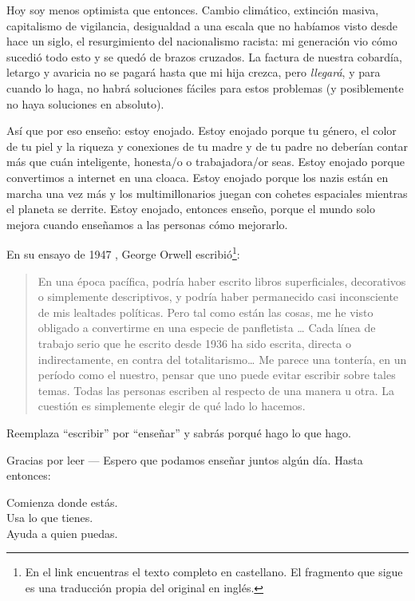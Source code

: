 Hoy soy menos optimista que entonces.
Cambio climático,
extinción masiva,
capitalismo de vigilancia,
desigualdad a una escala que no habíamos visto desde hace un siglo,
el resurgimiento del nacionalismo racista:
mi generación vio cómo sucedió todo esto y se quedó de brazos cruzados.
La factura de nuestra cobardía, letargo y avaricia no se pagará hasta que mi hija crezca,
pero \emph{llegará},
y para cuando lo haga, no habrá soluciones fáciles para estos problemas
(y posiblemente no haya soluciones en absoluto).

Así que por eso enseño:
estoy enojado.
Estoy enojado porque tu género, el color de tu piel y la riqueza y conexiones de tu madre y de tu padre
no deberían contar más que cuán inteligente, honesta/o o trabajadora/or seas.
Estoy enojado porque convertimos a internet en una cloaca.
Estoy enojado porque los nazis están en marcha una vez más
y los multimillonarios juegan con cohetes espaciales mientras el planeta se derrite.
Estoy enojado,
entonces enseño,
porque el mundo solo mejora cuando enseñamos a las personas cómo mejorarlo.

En su ensayo de 1947
, George Orwell escribió\footnote{En el link encuentras el texto completo en castellano. El fragmento que sigue es una traducción propia del original en inglés.}:

\begin{quote}

  En una época pacífica, podría haber escrito libros superficiales, decorativos o simplemente  descriptivos,
  y podría haber permanecido casi inconsciente de mis lealtades políticas.
  Pero tal como están las cosas, me he visto obligado a convertirme en una especie de panfletista {\ldots}
  Cada línea de trabajo serio que he escrito desde 1936 ha sido escrita,
  directa o indirectamente,
  en contra del totalitarismo{\ldots}
  Me parece una tontería,
  en un período como el nuestro,
  pensar que uno puede evitar escribir sobre tales temas.
  Todas las personas escriben al respecto de una manera u otra.
  La cuestión es simplemente elegir de qué lado lo hacemos.

\end{quote}

\noindent
Reemplaza ``escribir'' por ``enseñar'' y sabrás porqué hago lo que hago.

\vspace{\baselineskip}

\noindent
Gracias por leer --- Espero que podamos enseñar juntos algún día.
Hasta entonces:

\begin{center}

Comienza donde estás. \\
Usa lo que tienes. \\
Ayuda a quien puedas.

\end{center}
